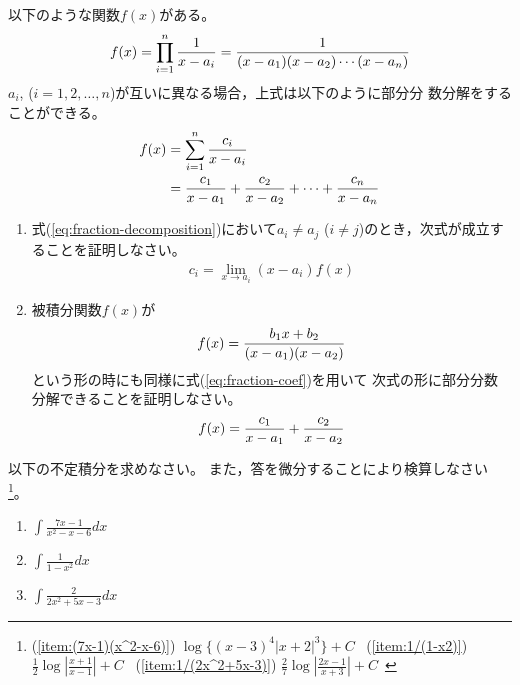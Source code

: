 \documentclass[twocolumn,11pt]{jarticle}
\begin{document}
\question
以下のような関数$f(x)$がある。
\begin{align}
  f(x)=\prod_{i=1}^n\frac{1}{x-a_i}
  =\frac{1}{(x-a_1)(x-a_2)\cdots(x-a_n)}\notag
\end{align}
$a_i$, ($i=1,2,\ldots,n$)が互いに異なる場合，上式は以下のように部分分
数分解をすることができる。
\begin{align}
  \label{eq:fraction-decomposition}
  f(x)&=\sum_{i=1}^n\frac{c_i}{x-a_i}\\
  &=\frac{c_1}{x-a_1}+\frac{c_2}{x-a_2}+\cdots+\frac{c_n}{x-a_n}\notag
\end{align}
\begin{enumerate}
\item 式(\ref{eq:fraction-decomposition})において$a_i\ne a_j$ ($i\ne
  j$)のとき，次式が成立することを証明しなさい。
\begin{align}
  \label{eq:fraction-coef}
  c_i=\lim_{x\to a_i}(x-a_i)f(x)
\end{align}
\item 被積分関数$f(x)$が
\begin{align}
  f(x)=\frac{b_1x+b_2}{(x-a_1)(x-a_2)}\notag
\end{align}
という形の時にも同様に式(\ref{eq:fraction-coef})を用いて
次式の形に部分分数分解できることを証明しなさい。
\begin{align}
  f(x)=\frac{c_1}{x-a_1}+\frac{c_2}{x-a_2}\notag
\end{align}
\end{enumerate}

\exercise
以下の不定積分を求めなさい。
また，答を微分することにより検算しなさい
\footnote{
(\ref{item:(7x-1)(x^2-x-6)}) $\log\{(x-3)^4|x+2|^3\}+C$~
(\ref{item:1/(1-x2)}) $\frac{1}{2}\log|\frac{x+1}{x-1}|+C$~
(\ref{item:1/(2x^2+5x-3)}) $\frac{2}{7}\log|\frac{2x-1}{x+3}|+C$~
}。
\begin{enumerate}
\item \label{item:(7x-1)(x^2-x-6)}$\displaystyle\int \frac{7x-1}{x^2-x-6}dx$
\item \label{item:1/(1-x2)}$\displaystyle\int \frac{1}{1-x^2}dx$
\item \label{item:1/(2x^2+5x-3)} $\displaystyle\int\frac{2}{2x^2+5x-3}dx$
\end{enumerate}
\end{document}
